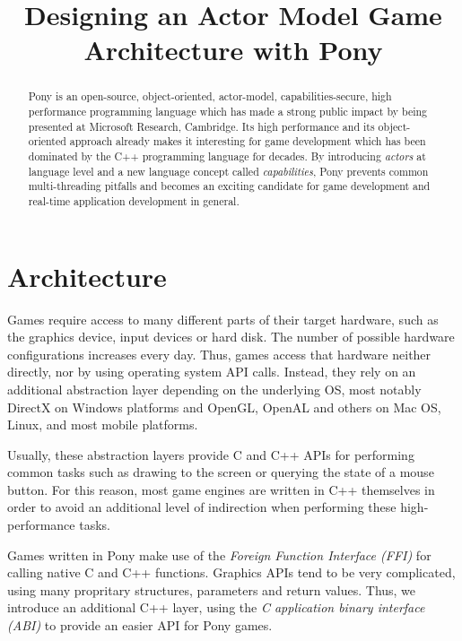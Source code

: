 \documentclass[9pt,conference]{IEEEtran}
\begin{document}
\title{Designing an Actor Model Game Architecture with Pony}

\author{
}

\maketitle

\begin{abstract}
Pony is an open-source, object-oriented, actor-model, capabilities-secure,
high performance programming language which has made a strong public impact by
being presented at Microsoft Research, Cambridge. Its high performance and
its object-oriented approach already makes it interesting for game development
which has been dominated by the C++ programming language for decades. By
introducing \emph{actors} at language level and a new language concept called
\emph{capabilities}, Pony prevents common multi-threading pitfalls and becomes
an exciting candidate for game development and real-time application development
in general.
\end{abstract}


\section{Architecture}
Games require access to many different parts of their target hardware,
such as the graphics device, input devices or hard disk. The number
of possible hardware configurations increases every day. Thus, games access that
hardware neither directly, nor by using operating system API calls. Instead,
they rely on an additional abstraction layer depending on the underlying OS,
most notably DirectX on Windows platforms and OpenGL, OpenAL and others on
Mac OS, Linux, and most mobile platforms.

Usually, these abstraction layers provide C and C++ APIs for performing common
tasks such as drawing to the screen or querying the state of a mouse button. For
this reason, most game engines are written in C++ themselves in order to avoid
an additional level of indirection when performing these high-performance tasks.

Games written in Pony make use of the \emph{Foreign Function Interface (FFI)}
for calling native C and C++ functions. Graphics APIs tend to be very
complicated, using many propritary structures, parameters and return values.
Thus, we introduce an additional C++ layer, using the \emph{C application binary
interface (ABI)} to provide an easier API for Pony games.
\end{document}
